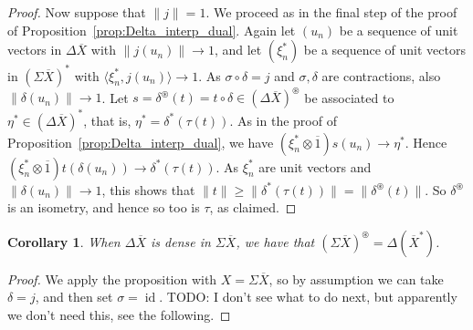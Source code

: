 \documentclass[a4paper,11pt]{article}
\theoremstyle{plain}
\newtheorem{corollary}[proposition]{Corollary}
\theoremstyle{remark}
\newcommand{\ip}[2]{{\langle {#1} , {#2} \rangle}}
\newcommand{\id}{\operatorname{id}}
\newcommand{\intdual}{\circledast}
\begin{document}
\begin{proof}
Now suppose that $\|j\|=1$.  We proceed as in the final step of the proof of Proposition~\ref{prop:Delta_interp_dual}.  Again let $(u_n)$ be a sequence of unit vectors in $\Delta\overline X$ with $\|j(u_n)\|\to 1$, and let $(\xi_n^*)$ be a sequence of unit vectors in $(\Sigma\overline X)^*$ with $\ip{\xi_n^*}{j(u_n)} \to 1$.  As $\sigma\circ\delta = j$ and $\sigma, \delta$ are contractions, also $\|\delta(u_n)\|\to 1$.  Let $s = \delta^\intdual(t) = t\circ \delta \in (\Delta\overline X)^\intdual$ be associated to $\eta^* \in (\Delta\overline X)^*$, that is, $\eta^* = \delta^*(\tau(t))$.  As in the proof of Proposition~\ref{prop:Delta_interp_dual}, we have $(\xi_n^*\otimes\overline 1) s(u_n) \to \eta^*$.
Hence $(\xi_n^*\otimes\overline 1) t(\delta(u_n)) \to \delta^*(\tau(t))$.  As $\xi_n^*$ are unit vectors and $\|\delta(u_n)\|\to 1$, this shows that $\|t\| \geq \|\delta^*(\tau(t))\| = \|\delta^\intdual(t)\|$.  So $\delta^\intdual$ is an isometry, and hence so too is $\tau$, as claimed.
\end{proof}

\begin{corollary}
When $\Delta\overline X$ is dense in $\Sigma\overline X$, we have that $(\Sigma\overline X)^\intdual = \Delta(\overline X^*)$.
\end{corollary}
\begin{proof}
We apply the proposition with $X = \Sigma\overline X$, so by assumption we can take $\delta = j$, and then set $\sigma=\id$.  TODO: I don't see what to do next, but apparently we don't need this, see the following.
\end{proof}
\end{document}
